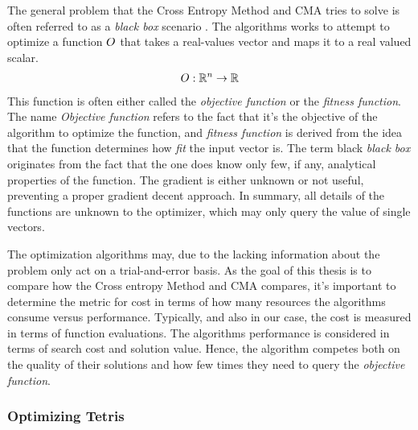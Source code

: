 The general problem that the Cross Entropy Method and CMA 
tries to solve is often referred  to as a \textit{black box}
scenario \citep{hansen2011}. The algorithms works to 
attempt to optimize a function $O$ that takes
a real-values vector and maps it to a real valued scalar.
\begin{align*}
O : \mathbb{R}^{n} \rightarrow \mathbb{R}
\end{align*}
This function is often either called the \textit{objective function}
or the \textit{fitness function}. The name \textit{Objective function}
refers to the fact that it's the objective of the algorithm to optimize
the function, and \textit{fitness function} is derived from the
idea that the function determines how \textit{fit} the input vector
is. The term black \textit{black box} originates from the fact that 
the one does know only few, if any, analytical properties of the function.
The gradient is either unknown or not useful, preventing a 
proper gradient 
decent approach. In summary, all details of the functions are unknown to 
the optimizer, which may only query the value of single vectors.
\begin{figure}[H]
\centering
{}
\end{figure}
The optimization algorithms may, due to the lacking information about the
problem only act on a trial-and-error basis. As the goal of this
thesis is to compare how the Cross entropy Method and CMA compares, 
it's important to determine the metric for cost in terms of 
how many resources the algorithms consume versus performance.
Typically, and also in our case, the cost is measured in terms 
of function evaluations. The algorithms performance is considered 
in terms of search cost and solution value. Hence, the algorithm 
competes both on the quality of their solutions and how few times
they need to query the \textit{objective function}.


\subsubsection{Optimizing Tetris \label{ConfigureTetrisBackground}}

